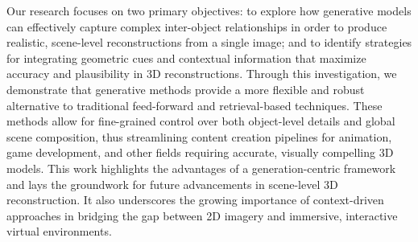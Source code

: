 
Our research focuses on two primary objectives: to explore how generative models can effectively capture complex inter-object relationships in order to produce realistic, scene-level reconstructions from a single image; and to identify strategies for integrating geometric cues and contextual information that maximize accuracy and plausibility in 3D reconstructions.
Through this investigation, we demonstrate that generative methods provide a more flexible and robust alternative to traditional feed-forward and retrieval-based techniques. These methods allow for fine-grained control over both object-level details and global scene composition, thus streamlining content creation pipelines for animation, game development, and other fields requiring accurate, visually compelling 3D models.
%
This work highlights the advantages of a generation-centric framework and lays the groundwork for future advancements in scene-level 3D reconstruction. It also underscores the growing importance of context-driven approaches in bridging the gap between 2D imagery and immersive, interactive virtual environments.

%
